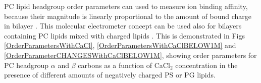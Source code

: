 \documentclass[aps,prl,superscriptaddress,twocolumn]{revtex4}
\begin{document}
PC lipid headgroup order parameters can used to measure ion binding
affinity, because their magnitude is linearly proportional
to the amount of bound charge in bilayer \cite{seelig87,catte16}.
This molecular electrometer concept can be used also
for bilayers containing PC lipids mixed with charged lipids \cite{borle85,macdonald87,roux90}.
This is demonstrated in Figs \ref{OrderParametersWithCaCl},
\ref{OrderParametersWithCaClBELOW1M} and \ref{OrderParameterCHANGESWithCaClBELOW1M},
showing order parameters for PC headgroup $\alpha$ and $\beta$ carbons
as a function of CaCl$_2$ concentration in the presence of different amounts of
negatively charged PS or PG lipids.
\end{document}
